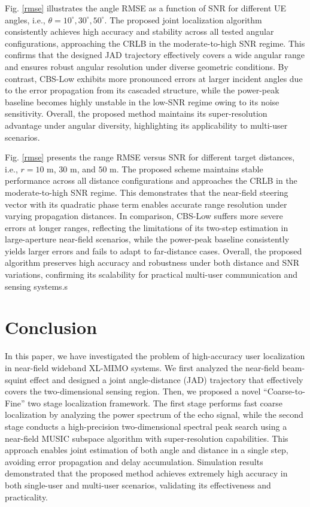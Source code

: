 \documentclass[lettersize,journal]{IEEEtran}
\begin{document}
Fig. \ref{rmse}  illustrates the angle RMSE as a function of SNR for different UE angles, i.e., $\theta = 10^\circ, 30^\circ, 50^\circ$. The proposed joint localization algorithm consistently achieves high accuracy and stability across all tested angular configurations, approaching the CRLB in the moderate-to-high SNR regime. This confirms that the designed JAD trajectory effectively covers a wide angular range and ensures robust angular resolution under diverse geometric conditions. By contrast, CBS-Low exhibits more pronounced errors at larger incident angles due to the error propagation from its cascaded structure, while the power-peak baseline becomes highly unstable in the low-SNR regime owing to its noise sensitivity. Overall, the proposed method maintains its super-resolution advantage under angular diversity, highlighting its applicability to multi-user scenarios.

Fig. \ref{rmse}  presents the range RMSE versus SNR for different target distances, i.e., $r = 10$ m, $30$ m, and $50$ m. The proposed scheme maintains stable performance across all distance configurations and approaches the CRLB in the moderate-to-high SNR regime. This demonstrates that the near-field steering vector with its quadratic phase term enables accurate range resolution under varying propagation distances. In comparison, CBS-Low suffers more severe errors at longer ranges, reflecting the limitations of its two-step estimation in large-aperture near-field scenarios, while the power-peak baseline consistently yields larger errors and fails to adapt to far-distance cases. Overall, the proposed algorithm preserves high accuracy and robustness under both distance and SNR variations, confirming its scalability for practical multi-user communication and sensing systems.s
\section{Conclusion}
\label{sec:conclusion}

In this paper, we have investigated the problem of high-accuracy user localization in near-field wideband XL-MIMO systems. We first analyzed the near-field beam-squint effect and designed a joint angle-distance (JAD) trajectory that effectively covers the two-dimensional sensing region. Then, we proposed a novel “Coarse-to-Fine” two stage localization framework. The first stage performs fast coarse localization by analyzing the power spectrum of the echo signal, while the second stage conducts a high-precision two-dimensional spectral peak search using a near-field MUSIC subspace algorithm with super-resolution capabilities. This approach enables joint estimation of both angle and distance in a single step, avoiding error propagation and delay accumulation. Simulation results demonstrated that the proposed method achieves extremely high accuracy in both single-user and multi-user scenarios, validating its effectiveness and practicality.
\end{document}

